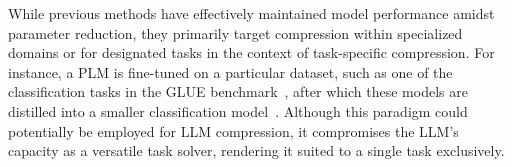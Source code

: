 \documentclass{article}
\begin{document}
While previous methods have effectively maintained model performance amidst parameter reduction, they primarily target compression within specialized domains or for designated tasks in the context of task-specific compression. For instance, a PLM is fine-tuned on a particular dataset, such as one of the classification tasks in the GLUE benchmark~\cite{wang2018glue}, after which these models are distilled into a smaller classification model~\cite{sun2019patient,hou2020dynabert}. Although this paradigm could potentially be employed for LLM compression, it compromises the LLM's capacity as a versatile task solver, rendering it suited to a single task exclusively.

\end{document}
